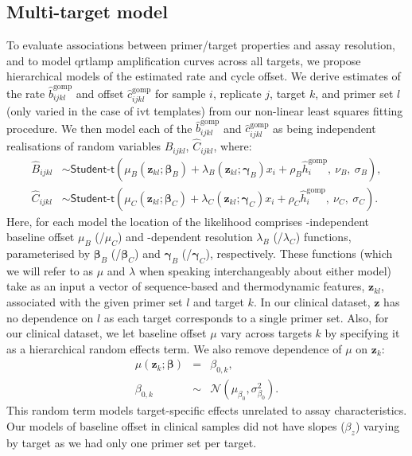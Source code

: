 \documentclass[../thesis.tex]{subfiles}
\begin{document}
\subsection{Multi-target model \label{sec:hierarchicalmodel}}
To evaluate associations between primer/target properties and assay resolution, and to model \gls{qrtlamp} amplification curves across all targets, we propose hierarchical models of the estimated rate and cycle offset. We derive estimates of the rate $\hat{b}^{\text{gomp}}_{ijkl}$ and offset $\hat{c}^{\text{gomp}}_{ijkl}$ for sample $i$, replicate $j$, target $k$, and primer set $l$ (only varied in the case of \gls{ivt}  templates) from our non-linear least squares fitting procedure. We then model each of the $\hat{b}^{\text{gomp}}_{ijkl}$ and $\hat{c}^{\text{gomp}}_{ijkl}$ as being independent realisations of random variables $\hat{B}_{ijkl}$, $\hat{C}_{ijkl}$, where: 
\begin{align} 
    \hat{B}_{ijkl}  & \sim  \textsf{Student-t}(\mu_B(\bm{z}_{kl}; \bm{\beta}_B) + \lambda_B(\bm{z}_{kl}; \bm{\gamma}_B) x_i + \rho_B \hat{h}^{\text{gomp}}_{i}, \ \nu_B, \ \sigma_B), \label{eq:bhm} \\
    \hat{C}_{ijkl}  & \sim  \textsf{Student-t}(\mu_C(\bm{z}_{kl}; \bm{\beta}_C) + \lambda_C(\bm{z}_{kl}; \bm{\gamma}_C) x_i + \rho_C \hat{h}^{\text{gomp}}_{i}, \ \nu_C, \ \sigma_C). \label{eq:chm}
\end{align}
Here, for each model the location of the likelihood comprises -independent baseline offset $\mu_B$ (/$\mu_C$) and -dependent resolution $\lambda_B$ (/$\lambda_C$) functions, parameterised by $\bm{\beta}_B$ (/$\bm{\beta}_C$) and $\bm{\gamma}_B$ (/$\bm{\gamma}_C$), respectively. These functions (which we will refer to as $\mu$ and $\lambda$ when speaking interchangeably about either model) take as an input a vector of sequence-based and thermodynamic features, $\bm{z}_{kl}$, associated with the given primer set $l$ and target $k$. In our clinical dataset, $\bm{z}$ has no dependence on $l$ as each target corresponds to a single primer set. Also, for our clinical dataset, we let baseline offset $\mu$ vary across targets $k$ by specifying it as a hierarchical random effects term. We also remove dependence of $\mu$ on $\bm{z}_{k}$:
\begin{eqnarray} \label{eq:muclin}
    \mu(\bm{z}_k; \bm{\beta}) &=& \beta_{0,k}, \\
    \beta_{0,k} &\sim& \mathcal{N}(\mu_{\beta_{0}},\sigma^{2}_{\beta_{0}}).
\end{eqnarray}
This random term models target-specific effects unrelated to assay characteristics. Our models of baseline offset in clinical samples did not have slopes ($\beta_{z}$) varying by target as we had only one primer set per target. 
\end{document}
